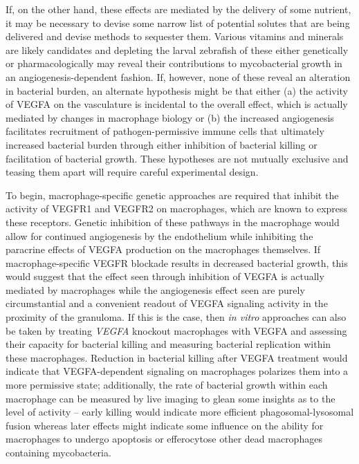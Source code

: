 If, on the other hand, these effects are mediated by the delivery of some nutrient, it may be necessary to devise some narrow list of potential solutes that are being delivered and devise methods to sequester them. Various vitamins and minerals are likely candidates and depleting the larval zebrafish of these either genetically or pharmacologically may reveal their contributions to mycobacterial growth in an angiogenesis-dependent fashion. If, however, none of these reveal an alteration in bacterial burden, an alternate hypothesis might be that either (a) the activity of VEGFA on the vasculature is incidental to the overall effect, which is actually mediated by changes in macrophage biology or (b) the increased angiogenesis facilitates recruitment of pathogen-permissive immune cells that ultimately increased bacterial burden through either inhibition of bacterial killing or facilitation of bacterial growth. These hypotheses are not mutually exclusive and teasing them apart will require careful experimental design.

To begin, macrophage-specific genetic approaches are required that inhibit the activity of VEGFR1 and VEGFR2 on macrophages, which are known to express these receptors. Genetic inhibition of these pathways in the macrophage would allow for continued angiogenesis by the endothelium while inhibiting the paracrine effects of VEGFA production on the macrophages themselves. If macrophage-specific VEGFR blockade results in decreased bacterial growth, this would suggest that the effect seen through inhibition of VEGFA is actually mediated by macrophages while the angiogenesis effect seen are purely circumstantial and a convenient readout of VEGFA signaling activity in the proximity of the granuloma. If this is the case, then \textit{in vitro} approaches can also be taken by treating \textit{VEGFA} knockout macrophages with VEGFA and assessing their capacity for bacterial killing and measuring bacterial replication within these macrophages. Reduction in bacterial killing after VEGFA treatment would indicate that VEGFA-dependent signaling on macrophages polarizes them into a more permissive state; additionally, the rate of bacterial growth within each macrophage can be measured by live imaging to glean some insights as to the level of activity -- early killing would indicate more efficient phagosomal-lysosomal fusion whereas later effects might indicate some influence on the ability for macrophages to undergo apoptosis or efferocytose other dead macrophages containing mycobacteria.

